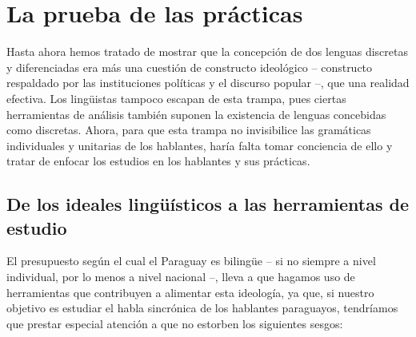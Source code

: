 \documentclass[output=paper]{langscibook}
\begin{document}
 \section{La prueba de las prácticas}


Hasta ahora hemos tratado de mostrar que la concepción de dos lenguas discretas y diferenciadas era más una cuestión de constructo ideológico -- constructo respaldado por las instituciones políticas y el discurso popular --, que una realidad efectiva. Los lingüistas tampoco escapan de esta trampa, pues ciertas herramientas de análisis también suponen la existencia de lenguas concebidas como discretas. Ahora, para que esta trampa no invisibilice las gramáticas individuales y unitarias de los hablantes, haría falta tomar conciencia de ello y tratar de enfocar los estudios en los hablantes y sus prácticas.

 \subsection{De los ideales lingüísticos a las herramientas de estudio}


El presupuesto según el cual el Paraguay es bilingüe -- si no siempre a nivel individual, por lo menos a nivel nacional --, lleva a que hagamos uso de herramientas que contribuyen a alimentar esta ideología, ya que, si nuestro objetivo es estudiar el habla sincrónica de los hablantes paraguayos, tendríamos que prestar especial atención a que no estorben los siguientes sesgos:
\end{document}
